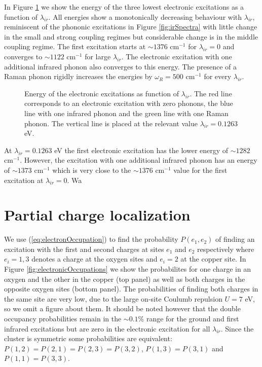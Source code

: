 In Figure \ref{fig:electrSpectra} we show the energy of the three lowest electronic excitations as a function of $\lambda_{ir}$.
All energies show a monotonically decreasing behaviour with $\lambda_{ir}$, reminiscent of the phononic excitations in Figure \ref{fig:irSpectra} with little change in the small and strong coupling regimes but considerable change is in the middle coupling regime.
The first excitation starts at $\sim 1376$ cm$^{-1}$ for $\lambda_{ir}=0$ and converges to $\sim 1122$ cm$^{-1}$ for large $\lambda_{ir}$.
The electronic excitation with one additional infrared phonon also converges to this energy.
The presence of a Raman phonon rigidly increases the energies by $\omega_R=500$ cm$^{-1}$ for every $\lambda_{ir}$.
%
\begin{figure}[ht]
  \centering
  
  \caption[Energy of the electronic excitations as function of $\lambda_{ir}$.]
  {Energy of the electronic excitations as function of $\lambda_{ir}$. 
    The red line corresponds to an electronic excitation with zero phonons, the blue line with one infrared phonon and the green line with one Raman phonon.
    The vertical line is placed at the relevant value $\lambda_{ir}=0.1263$ eV.}
  \label{fig:electrSpectra}
\end{figure}

At $\lambda_{ir}=0.1263$ eV the first electronic excitation has the lower energy of $\sim 1282$ cm$^{-1}$.
However, the excitation with one additional infrared phonon has an energy of $\sim 1373$ cm$^{-1}$ which is very close to the $\sim 1376$ cm$^{-1}$ value for the first excitation at $\lambda_{ir}=0$.
Wa
\section{Partial charge localization}
\label{sec:partialChargeLocalization}

We use (\ref{eq:electronOccupation}) to find the probability $P(e_1,e_2)$ of finding an excitation with the first and second charges at sites $e_1$ and $e_2$ respectively where $e_i=1,3$ denotes a charge at the oxygen sites and $e_i=2$ at the copper site.
In Figure \ref{fig:electronicOccupations} we show the probabilites for one charge in an oxygen and the other in the copper (top panel) as well as both charges in the opposite oxygen sites (bottom panel).
The probabilities of finding both charges in the same site are very low, due to the large on-site Coulumb repulsion $U=7$ eV, so we omit a figure about them.
It should be noted however that the double occupancy probabilities remain in the $\sim 0.1$\% range for the ground and first infrared excitations but are zero in the electronic excitation for all $\lambda_{ir}$.
Since the cluster is symmetric some probabilities are equivalent: $P(1,2)=P(2,1)=P(2,3)=P(3,2)$, $P(1,3)=P(3,1)$ and $P(1,1)=P(3,3)$.

